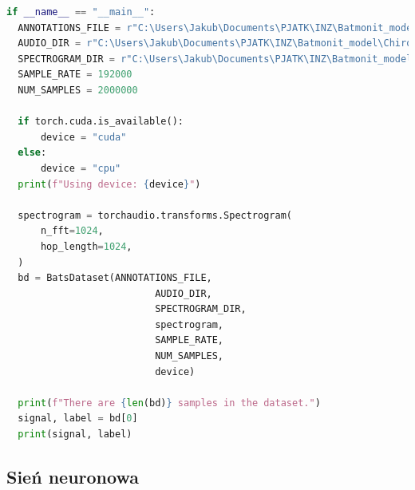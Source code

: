 \documentclass{sprz}
\begin{document}
\begin{lstlisting}[language=Python,caption={Implementacja modułu do ładowania danych}, label={lst:audio-to-spectrogram}]
  if __name__ == "__main__":
  ANNOTATIONS_FILE = r"C:\Users\Jakub\Documents\PJATK\INZ\Batmonit_model\Chiro_sounds_signed\Metadata\Annotations.csv"
  AUDIO_DIR = r"C:\Users\Jakub\Documents\PJATK\INZ\Batmonit_model\Chiro_sounds_signed\Audio"
  SPECTROGRAM_DIR = r"C:\Users\Jakub\Documents\PJATK\INZ\Batmonit_model\Chiro_sounds_signed\Spectrogram"
  SAMPLE_RATE = 192000
  NUM_SAMPLES = 2000000

  if torch.cuda.is_available():
      device = "cuda"
  else:
      device = "cpu"
  print(f"Using device: {device}")

  spectrogram = torchaudio.transforms.Spectrogram(
      n_fft=1024,
      hop_length=1024,
  )
  bd = BatsDataset(ANNOTATIONS_FILE,
                          AUDIO_DIR,
                          SPECTROGRAM_DIR, 
                          spectrogram, 
                          SAMPLE_RATE,
                          NUM_SAMPLES,
                          device)

  print(f"There are {len(bd)} samples in the dataset.")
  signal, label = bd[0]
  print(signal, label)
\end{lstlisting}

\subsection{Sień neuronowa}
\end{document}
